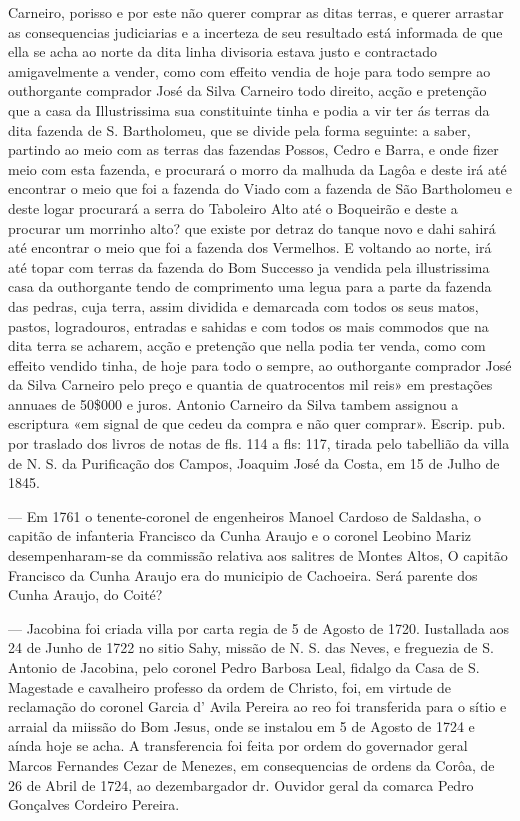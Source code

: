 Carneiro, porisso e por este não querer comprar as ditas terras, e querer arrastar as consequencias judiciarias e a incerteza de seu resultado está informada de que ella se acha ao norte da dita linha divisoria estava justo e contractado amigavelmente a vender, como com effeito vendia de hoje para todo sempre ao outhorgante comprador José da Silva Carneiro todo direito, acção e pretenção que a casa da Illustrissima sua constituinte tinha e podia a vir ter ás terras da dita fazenda de S. Bartholomeu, que se divide pela forma seguinte: a saber, partindo ao meio com as terras das fazendas Possos, Cedro e Barra, e onde fizer meio com esta fazenda, e procurará o morro da malhuda da Lagôa e deste irá até encontrar o meio que foi a fazenda do Viado com a fazenda de São Bartholomeu e deste logar procurará a serra do Taboleiro Alto até o Boqueirão e deste a procurar um morrinho alto? que existe por detraz do tanque novo e dahi sahirá até encontrar o meio que foi a fazenda dos Vermelhos. E voltando ao norte, irá até topar com terras da fazenda do Bom Successo ja vendida pela illustrissima casa da outhorgante tendo de comprimento uma legua para a parte da fazenda das pedras, cuja terra, assim dividida e demarcada com todos os seus matos, pastos, logradouros, entradas e sahidas e com todos os mais commodos que na dita terra se acharem, acção e pretenção que nella podia ter venda, como com effeito vendido tinha, de hoje para todo o sempre, ao outhorgante comprador José da Silva Carneiro pelo preço e quantia de quatrocentos mil reis» em prestações annuaes de 50\$000 e juros. Antonio Carneiro da Silva tambem assignou a escriptura «em signal de que cedeu da compra e não quer comprar». Escrip. pub. por traslado dos livros de notas de fls. 114 a fls: 117, tirada pelo tabellião da villa de N. S. da Purificação dos Campos, Joaquim José da Costa, em 15 de Julho de 1845.

— Em 1761 o tenente-coronel de engenheiros Manoel Cardoso de Saldasha, o capitão de infanteria Francisco da Cunha Araujo e o coronel Leobino Mariz desempenharam-se da commissão relativa aos salitres de Montes Altos, O
capitão Francisco da Cunha Araujo era do municipio de Cachoeira. Será parente dos Cunha Araujo, do Coité?


— Jacobina foi criada villa por carta regia de 5 de Agosto de 1720. Iustallada aos 24 de Junho de 1722 no sitio Sahy, missão de N. S. das Neves, e freguezia de S. Antonio de Jacobina, pelo coronel Pedro Barbosa Leal, fidalgo da Casa de S. Magestade e cavalheiro professo da ordem de Christo, foi, em virtude de reclamação do coronel Garcia d' Avila Pereira ao reo foi transferida para o sítio e arraial da miissão do Bom Jesus, onde se instalou em 5 de Agosto de 1724 e aínda hoje se acha. A transferencia foi feita por ordem do governador geral Marcos Fernandes Cezar de Menezes, em consequencias de ordens da Corôa, de 26 de Abril de 1724, ao dezembargador dr. Ouvidor geral da comarca Pedro Gonçalves Cordeiro Pereira.

